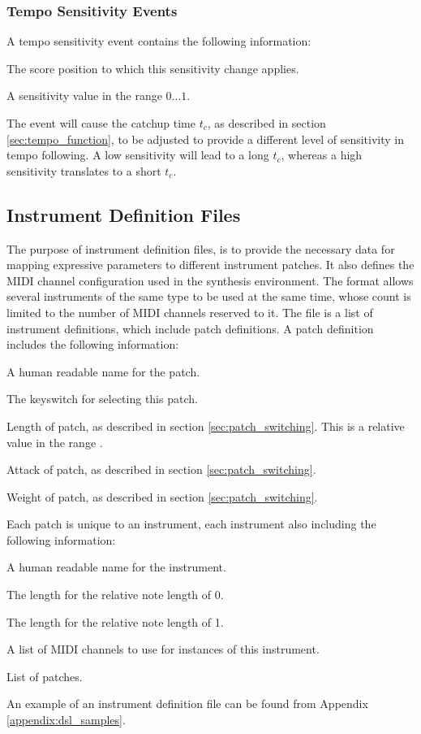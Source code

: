\subsubsection*{Tempo Sensitivity Events}

A tempo sensitivity event contains the following information:
\begin{description}[leftmargin=16ex]
\item[Position] The score position to which this sensitivity change applies.
\item[Sensitivity] A sensitivity value in the range $0 \ldots 1$.
\end{description}
The event will cause the catchup time $t_c$,
as described in section \ref{sec:tempo_function},
to be adjusted to provide a different level of sensitivity in tempo following.
A low sensitivity will lead to a long $t_c$,
whereas a high sensitivity translates to a short $t_c$.

\subsection{Instrument Definition Files}
\label{sec:instrument_definition_format}

The purpose of instrument definition files,
is to provide the necessary data for
mapping expressive parameters to different
instrument patches.
It also defines the MIDI channel configuration
used in the synthesis environment.
The format allows several instruments of the same type
to be used at the same time,
whose count is limited
to the number of MIDI channels reserved to it.
The file is a list of instrument definitions,
which include patch definitions.
A patch definition includes the following information:
\begin{description}[leftmargin=24ex]
\item[Name] A human readable name for the patch.
\item[Keyswitch] The keyswitch for selecting this patch.
\item[Length] Length of patch, as described in section \ref{sec:patch_switching}.
This is a relative value in the range .
\item[Attack] Attack of patch, as described in section \ref{sec:patch_switching}.
\item[Weight] Weight of patch, as described in section \ref{sec:patch_switching}.
\end{description}
Each patch is unique to an instrument,
each instrument also including the following information:
\begin{description}[leftmargin=24ex]
\item[Name] A human readable name for the instrument.
\item[Shortest note] The length for the relative note length of 0.
\item[Longest note] The length for the relative note length of 1.
\item[Channels] A list of MIDI channels to use for instances of this instrument.
\item[Patches] List of patches.
\end{description}
An example of an instrument definition file can be found from Appendix
\ref{appendix:dsl_samples}.


